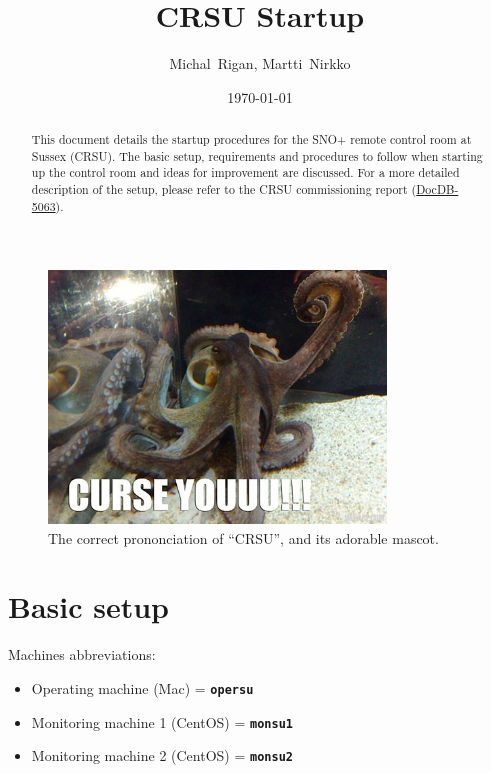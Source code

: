 \documentclass[12pt, a4paper]{article}
\title{CRSU Startup}
\author{Michal~Rigan, Martti~Nirkko}
\affil{University of Sussex}
\date{\today}
\begin{document}
\maketitle
\begin{abstract}
	This document details the startup procedures for the SNO+ remote control room at Sussex (CRSU). The basic setup, requirements and procedures to follow when starting up the control room and ideas for improvement are discussed. For a more detailed description of the setup, please refer to the CRSU commissioning report (\href{https://www.snolab.ca/snoplus/private/DocDB/cgi/ShowDocument?docid=5063}{DocDB-5063}).
\end{abstract}
\vspace{2cm}

\begin{figure}[htp]
	\centering
	\includegraphics[width=0.8\textwidth]{../Miscellaneous/crsu_mascot}
	\caption{The correct prononciation of ``CRSU'', and its adorable mascot.}
\end{figure}
\clearpage

\tableofcontents
\clearpage

\section{Basic setup}
Machines abbreviations:
\begin{itemize}
	\item Operating machine (Mac) = \textbf{\tt opersu}
	\item Monitoring machine 1 (CentOS) = \textbf{\tt monsu1}
	\item Monitoring machine 2 (CentOS) = \textbf{\tt monsu2}
\end{itemize}
\end{document}
